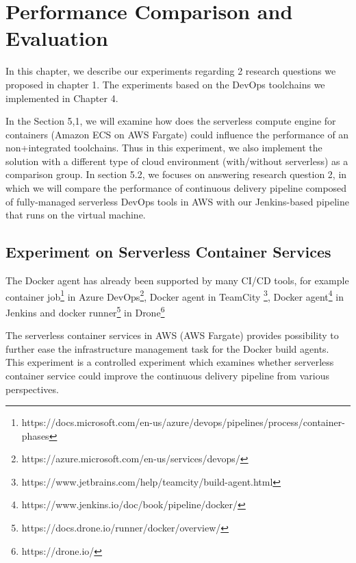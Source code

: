 \chapter{Performance Comparison and Evaluation}
In this chapter, we describe our experiments regarding 2 research questions we proposed in chapter 1. The experiments based on the DevOps toolchains we implemented in Chapter 4. 
\par
In the Section 5,1, we will examine how does the serverless compute engine for containers (Amazon ECS on AWS Fargate) could influence the performance of an non+integrated toolchains. Thus in this experiment, we also implement the solution with a different type of cloud environment (with/without serverless) as a comparison group. 
In section 5.2, we focuses on answering research question 2, in which we will compare the performance of continuous delivery pipeline composed of fully-managed serverless DevOps tools in AWS with our Jenkins-based pipeline that runs on the virtual machine.
\section{Experiment on Serverless Container Services}
The Docker agent has already been supported by many CI/CD tools, for example container job\footnote{https://docs.microsoft.com/en-us/azure/devops/pipelines/process/container-phases} in Azure DevOps\footnote{https://azure.microsoft.com/en-us/services/devops/}, Docker agent in TeamCity \footnote{https://www.jetbrains.com/help/teamcity/build-agent.html}, Docker agent\footnote{https://www.jenkins.io/doc/book/pipeline/docker/} in Jenkins and docker runner\footnote{https://docs.drone.io/runner/docker/overview/} in Drone\footnote{https://drone.io/}
\par
The serverless container services in AWS (AWS Fargate) provides possibility to further ease the infrastructure management task for the Docker build agents. 
This experiment is a controlled experiment which examines whether serverless container service could improve the continuous delivery pipeline from various perspectives.
